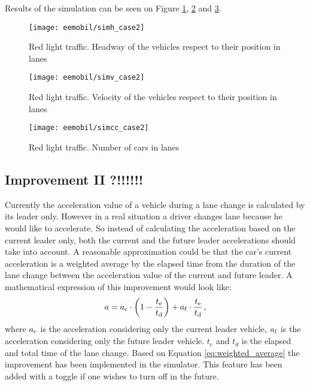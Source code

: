 		Results of the simulation can be seen on Figure \ref{fig:red_light_situationh_impr1}, \ref{fig:red_light_situationv_impr1} and \ref{fig:red_light_situationcc_impr1}.
		\begin{figure}
			\centering
			\texttt{[image: eemobil/simh\_case2]}
			\caption{Red light traffic. Headway of the vehicles respect to their position in lanes}
			\label{fig:red_light_situationh_impr1}
		\end{figure}
		\begin{figure}
			\centering
			\texttt{[image: eemobil/simv\_case2]}
			\caption{Red light traffic. Velocity of the vehicles respect to their position in lanes}
			\label{fig:red_light_situationv_impr1}
		\end{figure}
		\begin{figure}
			\centering
			\texttt{[image: eemobil/simcc\_case2]}
			\caption{Red light traffic. Number of cars in lanes }
			\label{fig:red_light_situationcc_impr1}
		\end{figure}
		\subsection{Improvement II ?!!!!!!}
		Currently the acceleration value of a vehicle during a lane change is calculated by its leader only. However in a real situation a driver changes lane because he would like to accelerate. So instead of calculating the acceleration based on the current leader only, both the current and the future leader accelerations should take into account. A reasonable approximation could be that the car's current acceleration is a weighted average by the elapsed time from the duration of the lane change between the acceleration value of the current and  future leader. A mathematical expression of this improvement would look like:
		\begin{equation}
			a=a_{\rm c} \cdot \left(1-\frac{t_{\rm e}}{t_{\rm d}}\right) + a_{\rm f}\cdot \frac{t_{\rm e}}{t_{\rm d}}\,,
			\label{eq:weighted_average}
		\end{equation}
		where $a_{\rm c}$ is the acceleration considering only the current leader vehicle, $a_{\rm f}$  is the acceleration considering only the future leader vehicle. $t_e$ and $t_d$ is the elapsed and total time of the lane change. Based on Equation \ref{eq:weighted_average} the improvement has been implemented in the simulator. This feature has been added with a toggle if one wishes to turn off in the future.
